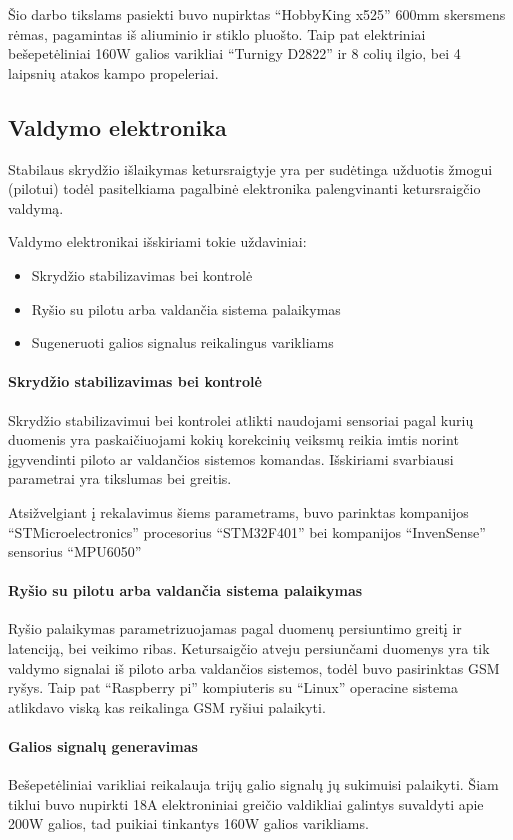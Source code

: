 \documentclass[12pt, a4paper, lithuanian, final]{article}
\begin{document}
Šio darbo tikslams pasiekti buvo nupirktas "`HobbyKing x525"' 600mm skersmens rėmas, pagamintas iš aliuminio ir stiklo pluošto.
Taip pat elektriniai bešepetėliniai 160W galios varikliai "`Turnigy D2822"' ir 8 colių ilgio, bei 4 laipsnių atakos kampo propeleriai.


\subsection{Valdymo elektronika}
Stabilaus skrydžio išlaikymas ketursraigtyje yra per sudėtinga užduotis žmogui (pilotui) todėl pasitelkiama pagalbinė elektronika palengvinanti ketursraigčio valdymą.

Valdymo elektronikai išskiriami tokie uždaviniai:
\begin{itemize}
	\item Skrydžio stabilizavimas bei kontrolė
	\item Ryšio su pilotu arba valdančia sistema palaikymas
	\item Sugeneruoti galios signalus reikalingus varikliams
\end{itemize}

\paragraph{Skrydžio stabilizavimas bei kontrolė}
Skrydžio stabilizavimui bei kontrolei atlikti naudojami sensoriai pagal kurių duomenis yra paskaičiuojami kokių korekcinių veiksmų reikia imtis norint įgyvendinti piloto ar valdančios sistemos komandas.
Išskiriami svarbiausi parametrai yra tikslumas bei greitis.

Atsižvelgiant į rekalavimus šiems parametrams, buvo parinktas kompanijos "`STMicroelectronics"' procesorius "`STM32F401"' bei kompanijos "`InvenSense"' sensorius "`MPU6050"'

\paragraph{Ryšio su pilotu arba valdančia sistema palaikymas}
Ryšio palaikymas parametrizuojamas pagal duomenų persiuntimo greitį ir latenciją, bei veikimo ribas.
Ketursaigčio atveju persiunčami duomenys yra tik valdymo signalai iš piloto arba valdančios sistemos, todėl buvo pasirinktas GSM ryšys.
Taip pat "`Raspberry pi"' kompiuteris su "`Linux"' operacine sistema atlikdavo viską kas reikalinga GSM ryšiui palaikyti.

\paragraph{Galios signalų generavimas}
Bešepetėliniai varikliai reikalauja trijų galio signalų jų sukimuisi palaikyti.
Šiam tiklui buvo nupirkti 18A elektroniniai greičio valdikliai galintys suvaldyti apie 200W galios, tad puikiai tinkantys 160W galios varikliams.
\end{document}
